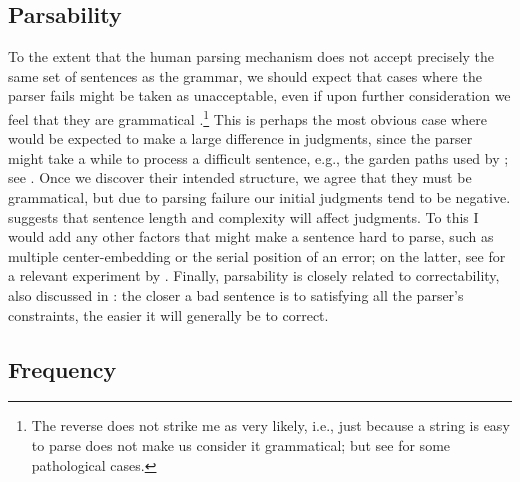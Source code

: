 \subsection{Parsability}\label{sec:5.3.3} 

To the extent that the human parsing mechanism does not accept precisely the same set of sentences as the grammar, we should expect that cases where the parser fails might be taken as unacceptable, even if upon further consideration we feel that they are 
grammatical \citep{ClarkEtAl1974}.\footnote{The reverse does not strike me as very likely, i.e., just because a string is easy to parse does not make us consider it grammatical; but see  for some pathological cases.}
This is perhaps the most obvious case where  would be expected to make a large difference in judgments, since the parser might take a while to process a difficult sentence, e.g., the garden paths used by \citet{WarnerEtAl1987}; see .
Once we discover their intended structure, we agree that they must be grammatical, but due to parsing failure our initial judgments tend to be negative. \citet{VanKleeck1982}
suggests that sentence length and complexity will affect judgments. To this I would add any other factors that might make a sentence hard to parse, such as multiple center-embedding or the serial position of an error; on the latter, see  for a relevant experiment by \citet{Marks1967}. Finally, parsability is closely related to correctability, also discussed in : the closer a bad sentence is to satisfying all the parser's constraints, the easier it will generally be to correct.

\subsection{Frequency}\label{sec:5.3.4} 

